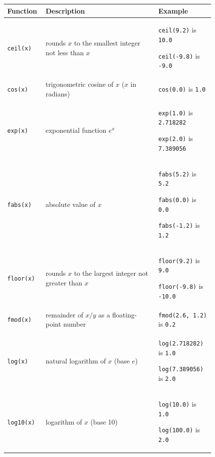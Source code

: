 \documentclass[10pt]{beamer}
\begin{document}
\begin{frame}
	\centering\scriptsize\renewcommand{\arraystretch}{1.5}
	\begin{tabular}{p{0.1\linewidth} p{0.5\linewidth} p{0.25\linewidth}}
		\hline
		\rowcolor{cyan}\color{white} Function & \color{white} Description & \color{white} Example \\\hline
		
		\rowcolor{lightcyan} \texttt{ceil(x)} & rounds $x$ to the smallest integer not less than $x$ & 
		\texttt{ceil(9.2)} is \texttt{10.0}
		
		\texttt{ceil(-9.8)} is \texttt{-9.0}\\\hline
		
		
		\rowcolor{lightcyan} \texttt{cos(x)} & trigonometric cosine of $x$ ($x$ in radians) & \texttt{cos(0.0)} is \texttt{1.0} \\\hline
		
		
		\rowcolor{lightcyan} \texttt{exp(x)} & exponential function $e^x$ & 
		\texttt{exp(1.0)} is \texttt{2.718282}
			
		\texttt{exp(2.0)} is \texttt{7.389056}\\\hline
		
		
		\rowcolor{lightcyan} \texttt{fabs(x)} & absolute value of $x$ & 
		\texttt{fabs(5.2)} is \texttt{5.2} 
			
		\texttt{fabs(0.0)} is \texttt{0.0} 
			
		\texttt{fabs(-1.2)} is \texttt{1.2}\\\hline
		
		
		\rowcolor{lightcyan} \texttt{floor(x)} & rounds $x$ to the largest integer not greater than $x$ & \texttt{floor(9.2)} is \texttt{9.0}
		
		
		\texttt{floor(-9.8)} is \texttt{-10.0} \\\hline
		
		
		\rowcolor{lightcyan} \texttt{fmod(x)} & remainder of $x/y$ as a floating-point number & \texttt{fmod(2.6, 1.2)} is \texttt{0.2} \\\hline
		
		
		\rowcolor{lightcyan} \texttt{log(x)} & natural logarithm of $x$ (base $e$) & 
		\texttt{log(2.718282)} is \texttt{1.0}
		
		
		\texttt{log(7.389056)} is \texttt{2.0} \\\hline
		
		
		\rowcolor{lightcyan} \texttt{log10(x)} & logarithm of $x$ (base 10) & 
		\texttt{log(10.0)} is \texttt{1.0}
		
		
		\texttt{log(100.0)} is \texttt{2.0} \\\hline
		

\end{tabular}
\end{frame}
\end{document}

